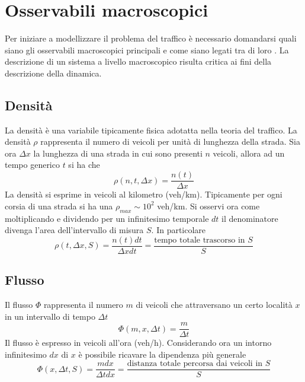 \documentclass[../main.tex]{subfiles}
\begin{document}
\section{Osservabili macroscopici}
Per iniziare a modellizzare il problema del traffico \`e necessario domandarsi quali siano gli osservabili macroscopici principali e come siano legati tra di loro \cite{H111}.
La descrizione di un sistema a livello macroscopico risulta critica ai fini della descrizione della dinamica.
\subsection{Densit\`a}
La densit\`a \`e una variabile tipicamente fisica adotatta nella teoria del traffico.
La densit\`a $\rho$ rappresenta il numero di veicoli per unit\`a di lunghezza della strada.
Sia ora $\Delta x$ la lunghezza di una strada in cui sono presenti $n$ veicoli, allora ad un tempo generico $t$ si ha che
\begin{equation*}
    \rho(n,t,\Delta x)=\frac{n(t)}{\Delta x}
\end{equation*}
La densit\`a si esprime in veicoli al kilometro (veh/km).
Tipicamente per ogni corsia di una strada si ha una $\rho_{max}\sim 10^2$ veh/km.
Si osservi ora come moltiplicando e dividendo per un infinitesimo temporale $dt$ il denominatore divenga l'area dell'intervallo di misura $S$.
In particolare
\begin{equation}
    \rho(t,\Delta x, S)=\frac{n(t)dt}{\Delta x dt}=\frac{\mbox{tempo totale trascorso in }S}{S}
    \label{eq:rho_s}
\end{equation}

\subsection{Flusso}
Il flusso $\Phi$ rappresenta il numero $m$ di veicoli che attraversano un certo localit\`a $x$ in un intervallo di tempo $\Delta t$
\begin{equation}
    \Phi(m, x, \Delta t)=\frac{m}{\Delta t}
\end{equation}
Il flusso \`e espresso in veicoli all'ora (veh/h).
Considerando ora un intorno infinitesimo $dx$ di $x$ \`e possibile ricavare la dipendenza più generale
\begin{equation}
    \Phi(x, \Delta t, S)=\frac{mdx}{\Delta t dx}=\frac{\mbox{distanza totale percorsa dai veicoli in }S}{S}
    \label{eq:phi_s}
\end{equation}
\end{document}
